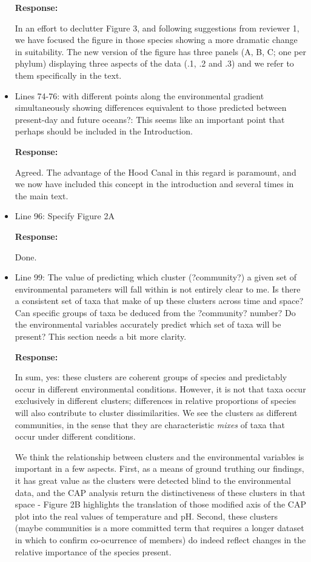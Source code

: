 \documentclass[11pt]{article}
\begin{document}
\begin{linenumbers}
\begin{itemize}
\textbf{Response:}

In an effort to declutter Figure 3, and following suggestions from reviewer 1, we have focused the figure in those species showing a more dramatic change in suitability. The new version of the figure has three panels (A, B, C; one per phylum) displaying three aspects of the data (.1, .2 and .3) and we refer to them specifically in the text.

\item{Lines 74-76: with different points along the environmental gradient simultaneously showing differences equivalent to those predicted between present-day and future oceans?: This seems like an important point that perhaps should be included in the Introduction.}

\textbf{Response:}

Agreed. The advantage of the Hood Canal in this regard is paramount, and we now have included this concept in the introduction and several times in the main text.

\item{Line 96: Specify Figure 2A}

\textbf{Response:}

Done.

\item{Line 99: The value of predicting which cluster (?community?) a given set of environmental parameters will fall within is not entirely clear to me. Is there a consistent set of taxa that make of up these clusters across time and space? Can specific groups of taxa be deduced from the ?community? number? Do the environmental variables accurately predict which set of taxa will be present? This section needs a bit more clarity.}

\textbf{Response:}

In sum, yes: these clusters are coherent groups of species and predictably occur in different environmental conditions. However, it is not that taxa occur exclusively in different clusters;  differences in relative proportions of species will also contribute to cluster dissimilarities. We see the clusters as different communities, in the sense that they are characteristic \textit{mixes} of taxa that occur under different conditions. 

We think the relationship between clusters and the environmental variables is important in a few aspects. First, as a means of ground truthing our findings, it has great value as the clusters were detected blind to the environmental data, and the CAP analysis return the distinctiveness of these clusters in that space - Figure 2B highlights the translation of those modified axis of the CAP plot into the real values of temperature and pH. Second, these clusters (maybe communities is a more committed term that requires a longer dataset in which to confirm co-ocurrence of members) do indeed reflect changes in the relative importance of the species present.




\end{itemize}
\end{linenumbers}
\end{document}
